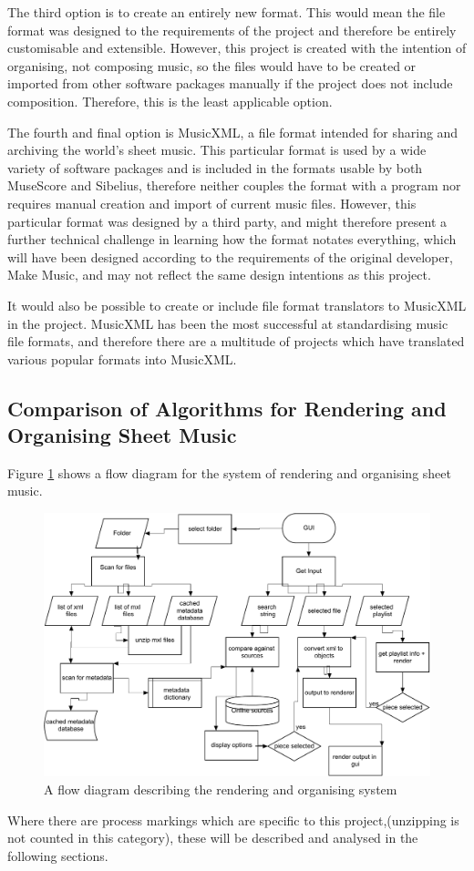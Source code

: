 The third option is to create an entirely new format. This would mean the file format was designed to the requirements of the project and therefore be entirely customisable and extensible. However, this project is created with the intention of organising, not composing music, so the files would have to be created or imported from other software packages manually if the project does not include composition. Therefore, this is the least applicable option.

The fourth and final option is MusicXML, a file format intended for sharing and archiving the world's sheet music\parencite{mxml}. This particular format is used by a wide variety of software packages\parencite{mxml} and is included in the formats usable by both MuseScore\parencite{MuseTour} and Sibelius\parencite{avid}, therefore neither couples the format with a program nor requires manual creation and import of current music files. However, this particular format was designed by a third party, and might therefore present a further technical challenge in learning how the format notates everything, which will have been designed according to the requirements of the original developer, Make Music\parencite{mxml}, and may not reflect the same design intentions as this project.

It would also be possible to create or include file format translators to MusicXML in the project. MusicXML has been the most successful at standardising music file formats\parencite{mxmlSoft}, and therefore there are a multitude of projects which have translated various popular formats into MusicXML.

\subsection{Comparison of Algorithms for Rendering and Organising Sheet Music}
Figure \ref{fig:flow} shows a flow diagram for the system of rendering and organising sheet music. \\
\begin{figure}[h]
    \centering
    \includegraphics[width=350pt]{flow-diagram-whole-system-crop}
    \caption{A flow diagram describing the rendering and organising system}
    \label{fig:flow}
\end{figure}
Where there are process markings which are specific to this project,(unzipping is not counted in this category), these will be described and analysed in the following sections.

